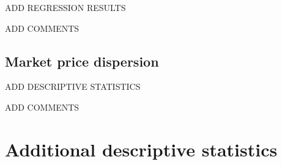 \documentclass[english]{article}
\begin{document}
ADD REGRESSION RESULTS

ADD COMMENTS

\subsection{Market price dispersion}

ADD DESCRIPTIVE STATISTICS

ADD COMMENTS

\newpage



\newpage

\appendix

\section{Additional descriptive statistics}
\end{document}
